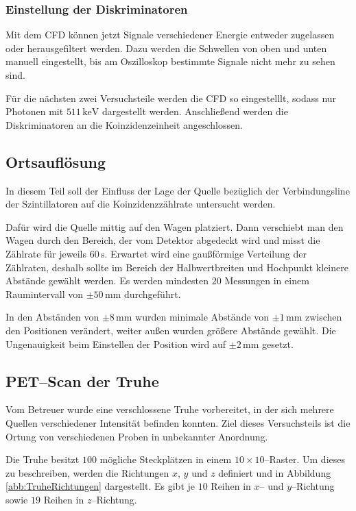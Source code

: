 \documentclass[12pt,a4paper]{scrartcl}
\numberwithin{equation}{section} %
\newcommand{\pu}[1]{\ensuremath{\mathrm{#1}}}
\begin{document}
\subsubsection{Einstellung der Diskriminatoren}
Mit dem CFD können jetzt Signale verschiedener Energie entweder zugelassen oder herausgefiltert werden. Dazu werden die Schwellen von oben und unten manuell eingestellt, bis am Oszilloskop bestimmte Signale nicht mehr zu sehen sind.

Für die nächsten zwei Versuchsteile werden die CFD so eingestelllt, sodass nur Photonen mit $\pu{511\, keV}$ dargestellt werden. Anschließend werden die Diskriminatoren an die Koinzidenzeinheit angeschlossen.

\subsection{Ortsauflösung}
\label{sec:Ortsauflösung}
In diesem Teil soll der Einfluss der Lage der Quelle bezüglich der Verbindungsline der Szintillatoren auf die Koinzidenzzählrate untersucht werden.

Dafür wird die Quelle mittig auf den Wagen platziert. Dann verschiebt man den Wagen durch den Bereich, der vom Detektor abgedeckt wird und misst die Zählrate für jeweils $60\,\mathrm{s}$. Erwartet wird eine gaußförmige Verteilung der Zählraten, deshalb sollte im Bereich der Halbwertbreiten und Hochpunkt kleinere Abstände gewählt werden. Es werden mindesten $20$ Messungen in einem Raumintervall von $\pm 50\,\mathrm{mm}$ durchgeführt.

In den Abständen von $\pm 8\,\mathrm{mm}$ wurden minimale Abstände von $\pm 1\,\mathrm{mm}$ zwischen den Positionen verändert, weiter außen wurden größere Abstände gewählt. Die Ungenauigkeit beim Einstellen der Position wird auf $\pu{\pm 2\, mm}$ gesetzt.

\subsection{PET--Scan der Truhe}
Vom Betreuer wurde eine verschlossene Truhe vorbereitet, in der sich mehrere Quellen verschiedener Intensität befinden konnten.  Ziel dieses Versuchsteils ist die Ortung von verschiedenen Proben in unbekannter Anordnung.

Die Truhe besitzt $100$ mögliche Steckplätzen in einem $10\times10$--Raster. Um dieses zu beschreiben, werden die Richtungen $x$, $y$ und $z$ definiert und in Abbildung \ref{abb:TruheRichtungen} dargestellt. Es gibt je $10$ Reihen in $x$-- und $y$--Richtung sowie $19$ Reihen in $z$--Richtung.
\end{document}
